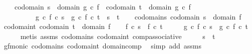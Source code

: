 \begin{isabellebody}
\ \ \ \ codomain\ s\ {\isacharequal}{\kern0pt}\ domain\ {\isacharparenleft}{\kern0pt}g\ {\isasymcirc}\isactrlsub c\ f{\isacharparenright}{\kern0pt}\ {\isasymand}\ codomain\ t\ {\isacharequal}{\kern0pt}\ domain\ {\isacharparenleft}{\kern0pt}g\ {\isasymcirc}\isactrlsub c\ f{\isacharparenright}{\kern0pt}\ {\isasymlongrightarrow}\isanewline
\ \ \ \ \ \ \ \ \ \ {\isacharparenleft}{\kern0pt}g\ {\isasymcirc}\isactrlsub c\ f{\isacharparenright}{\kern0pt}\ {\isasymcirc}\isactrlsub c\ s\ {\isacharequal}{\kern0pt}\ {\isacharparenleft}{\kern0pt}g\ {\isasymcirc}\isactrlsub c\ f{\isacharparenright}{\kern0pt}\ {\isasymcirc}\isactrlsub c\ t\ {\isasymlongrightarrow}\ s\ {\isacharequal}{\kern0pt}\ t{\isachardoublequoteclose}\isanewline
\ \ \isamarkupfalse%
\ codomain{\isacharunderscore}{\kern0pt}s{\isacharcolon}{\kern0pt}\ {\isachardoublequoteopen}codomain\ s\ {\isacharequal}{\kern0pt}\ domain\ f{\isachardoublequoteclose}\isanewline
\ \ \isamarkupfalse%
\ codomain{\isacharunderscore}{\kern0pt}t{\isacharcolon}{\kern0pt}\ {\isachardoublequoteopen}codomain\ t\ {\isacharequal}{\kern0pt}\ domain\ f{\isachardoublequoteclose}\isanewline
\ \ \isamarkupfalse%
\ {\isachardoublequoteopen}f\ {\isasymcirc}\isactrlsub c\ s\ {\isacharequal}{\kern0pt}\ f\ {\isasymcirc}\isactrlsub c\ t{\isachardoublequoteclose}\isanewline
\isanewline
\ \ \isamarkupfalse%
\ \isamarkupfalse%
\ {\isachardoublequoteopen}{\isacharparenleft}{\kern0pt}g\ {\isasymcirc}\isactrlsub c\ f{\isacharparenright}{\kern0pt}\ {\isasymcirc}\isactrlsub c\ s\ {\isacharequal}{\kern0pt}\ {\isacharparenleft}{\kern0pt}g\ {\isasymcirc}\isactrlsub c\ f{\isacharparenright}{\kern0pt}\ {\isasymcirc}\isactrlsub c\ t{\isachardoublequoteclose}\isanewline
\ \ \ \ \isamarkupfalse%
\ {\isacharparenleft}{\kern0pt}metis\ assms\ codomain{\isacharunderscore}{\kern0pt}s\ codomain{\isacharunderscore}{\kern0pt}t\ comp{\isacharunderscore}{\kern0pt}associative{\isacharparenright}{\kern0pt}\isanewline
\ \ \isamarkupfalse%
\ \isamarkupfalse%
\ {\isachardoublequoteopen}s\ {\isacharequal}{\kern0pt}\ t{\isachardoublequoteclose}\isanewline
\ \ \ \ \isamarkupfalse%
\ gf{\isacharunderscore}{\kern0pt}monic\ codomain{\isacharunderscore}{\kern0pt}s\ codomain{\isacharunderscore}{\kern0pt}t\ domain{\isacharunderscore}{\kern0pt}comp\ \isamarkupfalse%
\ {\isacharparenleft}{\kern0pt}simp\ add{\isacharcolon}{\kern0pt}\ assms{\isacharparenright}{\kern0pt}\isanewline
{}\isamarkupfalse%

\end{isabellebody}
